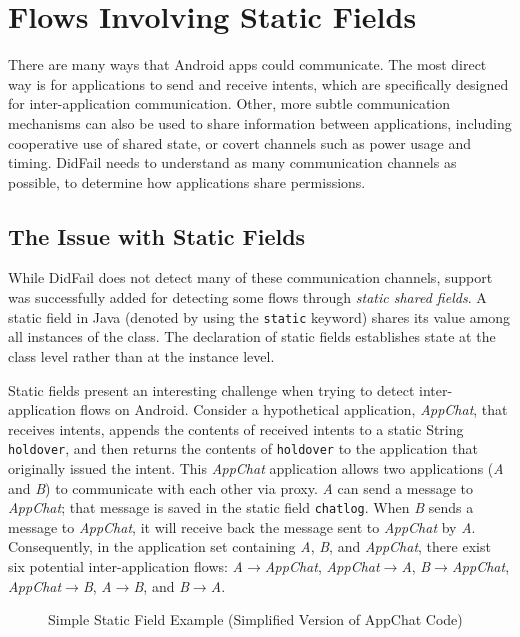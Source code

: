\newpage
{}
\chapter{Flows Involving Static Fields} \label{chap:static_fields}

There are many ways that Android apps could communicate. The most direct way is for applications to send and receive intents, which are specifically designed for inter-application communication. Other, more subtle communication mechanisms can also be used to share information between applications, including cooperative use of shared state, or covert channels such as power usage and timing. DidFail needs to understand as many communication channels as possible, to determine how applications share permissions.

\section{The Issue with Static Fields}

While DidFail does not detect many of these communication channels, support was successfully added for detecting some flows through \emph{static shared fields}. A static field in Java (denoted by using the \texttt{static} keyword) shares its value among all instances of the class. The declaration of static fields establishes state at the class level rather than at the instance level.

Static fields present an interesting challenge when trying to detect inter-application flows on Android. Consider a hypothetical application, \emph{AppChat}, that receives intents, appends the contents of received intents to a static String \texttt{holdover}, and then returns the contents of \texttt{holdover} to the application that originally issued the intent. This \emph{AppChat} application allows two applications (\emph{A} and \emph{B}) to communicate with each other via proxy. \emph{A} can send a message to \emph{AppChat}; that message is saved in the static field \texttt{chatlog}. When \emph{B} sends a message to \emph{AppChat}, it will receive back the message sent to \emph{AppChat} by \emph{A}. Consequently, in the application set containing \emph{A}, \emph{B}, and \emph{AppChat}, there exist six potential inter-application flows: \emph{A$\rightarrow$AppChat}, \emph{AppChat$\rightarrow$A}, \emph{B$\rightarrow$AppChat}, \emph{AppChat$\rightarrow$B}, \emph{A$\rightarrow$B}, and \emph{B$\rightarrow$A}.

\begin{figure}
\begin{framed}

\caption{Simple Static Field Example (Simplified Version of AppChat Code)}
\label{fig:appchat}
\end{framed}
\end{figure}

